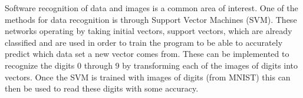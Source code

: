 
\noindent
{Software recognition of data and images is a common area of interest. One of the methods for data recognition is through Support Vector Machines (SVM). These networks operating by taking initial vectors, support vectors, which are already classified and are used in order to train the program to be able to accurately predict which data set a new vector comes from. These can be implemented to recognize the digits 0 through 9 by transforming each of the images of digits into vectors. Once the SVM is trained with images of digits (from MNIST) this can then be used to read these digits with some accuracy.}